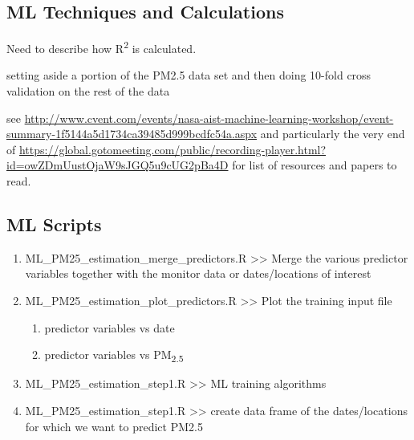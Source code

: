
\subsection{ML Techniques and Calculations}

Need to describe how R\textsuperscript{2} is calculated.

setting aside a portion of the PM2.5 data set and then doing 10-fold cross validation on the rest of the data

see \url{http://www.cvent.com/events/nasa-aist-machine-learning-workshop/event-summary-1f5144a5d1734ca39485d999bcdfc54a.aspx} and particularly the very end of \url{https://global.gotomeeting.com/public/recording-player.html?id=owZDmUustOjaW9sJGQ5u9cUG2pBa4D} for list of resources and papers to read.


\subsection{ML Scripts}

\begin{enumerate}

\item ML\_PM25\_estimation\_merge\_predictors.R >>  Merge the various predictor variables together with the monitor data or dates/locations of interest %

\item ML\_PM25\_estimation\_plot\_predictors.R >> Plot the training input file %
	\begin{enumerate}
		\item predictor variables vs date
		\item predictor variables vs PM\textsubscript{2.5}
	\end{enumerate}

\item ML\_PM25\_estimation\_step1.R >> ML training algorithms

\item ML\_PM25\_estimation\_step1.R >> create data frame of the dates/locations for which we want to predict PM2.5

\end{enumerate}